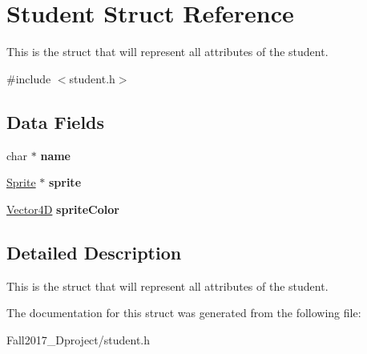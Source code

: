 \hypertarget{struct_student}{}\section{Student Struct Reference}
\label{struct_student}


This is the struct that will represent all attributes of the student.  




{\ttfamily \#include $<$student.\+h$>$}

\subsection*{Data Fields}
\begin{DoxyCompactItemize}
\item 
\mbox{\label{struct_student_a5ac083a645d964373f022d03df4849c8}} 
char $\ast$ {\bfseries name}
\item 
\mbox{\label{struct_student_a7c54302f990f134ca6e37a2e9ef9999d}} 
\hyperlink{struct_sprite___s}{Sprite} $\ast$ {\bfseries sprite}
\item 
\mbox{\label{struct_student_a34baf45a25100899cd17d061048d0ce5}} 
\hyperlink{struct_vector4_d}{Vector4D} {\bfseries sprite\+Color}
\end{DoxyCompactItemize}


\subsection{Detailed Description}
This is the struct that will represent all attributes of the student. 

The documentation for this struct was generated from the following file\+:\begin{DoxyCompactItemize}
\item 
Fall2017\+\_\+Dproject/student.\+h\end{DoxyCompactItemize}
